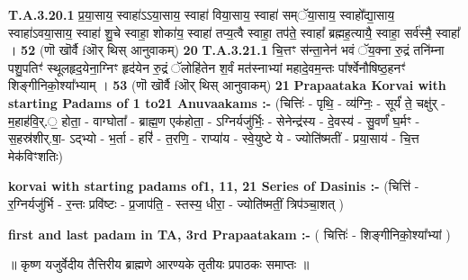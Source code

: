 \documentclass[17pt]{extarticle}
\begin{document}
                                \textbf{ T.A.3.20.1} \newline
                  प्र॒या॒साय॒ स्वाहा॑ऽऽया॒साय॒ स्वाहा॑ विया॒साय॒ स्वाहा॑ सम्ॅया॒साय॒ स्वाहो᳚द्या॒साय॒ स्वाहा॑ऽवया॒साय॒ स्वाहा॑ शु॒चे स्वाहा॒ शोका॑य॒ स्वाहा॑ तप्य॒त्वै स्वाहा॒ तप॑ते॒ स्वाहा᳚ ब्रह्मह॒त्यायै॒ स्वाहा॒ सर्व॑स्मै॒ स्वाहा᳚ । \textbf{ 52} \newline
                  \newline
                                                        (णॊ खॊर्वै fऒर् थिस् आनुवाकम्) \textbf{20} \newline \newline
                                \textbf{ T.A.3.21.1} \newline
                  चि॒त्तꣳ स॑न्ता॒नेन॑ भवं ॅय॒क्ना रु॒द्रं तनि॑म्ना पशु॒पतिꣳ॑ स्थूलहृद॒येना॒ग्निꣳ हृद॑येन रु॒द्रं ॅलोहि॑तेन श॒र्वं मत॑स्नाभ्यां  महादे॒वम॒न्तः पा᳚र्श्वेनौषिष्ठ॒हनꣳ॑ शिङ्गीनिको॒श्या᳚भ्याम् । \textbf{ 53} \newline
                  \newline
                                                        (णॊ खॊर्वै fऒर् थिस् आनुवाकम्) \textbf{21} \newline \newline
\textbf{Prapaataka Korvai with starting Padams of 1 to21 Anuvaakams :-} \newline
(चित्तिः॑ - पृथि॒ - व्य॑ग्निः॒ - सूर्यं॑ ते॒ चक्षु॑र् - म॒हाह॑वि॒र्.॒ होता॒ - वाग्घोता᳚ - ब्राह्म॒ण एक॑होता॒ - ऽग्निर्यजु॑र्भिः॒ - सेनेन्द्र॑स्य - दे॒वस्य॑ - सु॒वर्णं॑ घ॒र्मꣳ - स॒हस्र॑शीर्.षा॒- ऽद्भ्यो - भ॒र्ता - हरिं॑ - त॒रणि॒ - राप्या॑य - स्वे॒युष्टे ये - ज्योति॑ष्मतीं - प्रया॒साय॑ - चि॒त्त मेक॑विꣳशतिः) \newline

\textbf{korvai with starting padams of1, 11, 21 Series of Dasinis :-} \newline
(चित्ति॑ - र॒ग्निर्यजु॑र्भि - र॒न्तः प्रवि॑ष्टः - प्र॒जाप॑ति॒ - स्तस्य॒ धीरा॒ - ज्योति॑ष्मतीं॒ त्रिप॑ञ्चा॒शत् ) \newline

\textbf{first and last padam in TA, 3rd Prapaatakam :-} \newline
( चित्तिः॑ - शिङ्गीनिको॒श्या᳚भ्यां ) \newline 


॥ कृष्ण यजुर्वेदीय तैत्तिरीय ब्राह्मणे आरण्यके तृतीयः प्रपाठकः समाप्तः ॥ \newline
\pagebreak
\pagebreak
        
\end{document}
